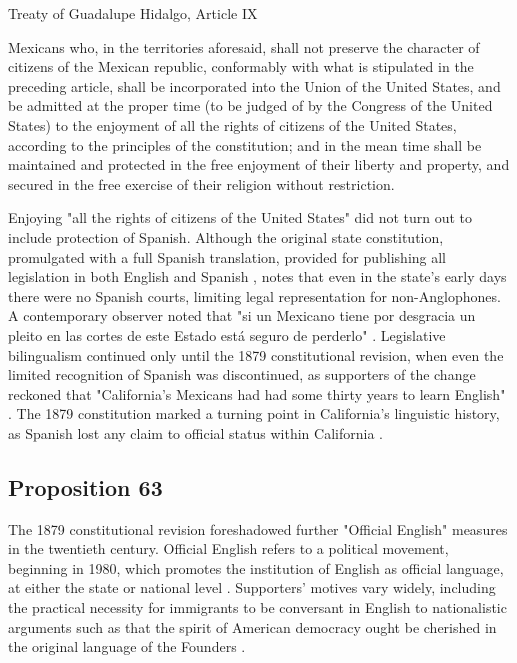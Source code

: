 \begin{aquote}{Treaty of Guadalupe Hidalgo, Article IX \parencite{guadalupe}}

	Mexicans who, in the territories aforesaid, shall not preserve the character
	of citizens of the Mexican republic, conformably with what is stipulated in
	the preceding article, shall be incorporated into the Union of the United
	States, and be admitted at the proper time (to be judged of by the Congress
	of the United States) to the enjoyment of all the rights of citizens of the
	United States, according to the principles of the constitution; and in the
	mean time shall be maintained and protected in the free enjoyment of their
	liberty and property, and secured in the free exercise of their religion
	without restriction.

\end{aquote}

Enjoying "all the rights of citizens of the United States" did not turn out to
include protection of Spanish. Although the original state constitution,
promulgated with a full Spanish translation, provided for publishing all
legislation in both English and Spanish \parencite{baron92},
\textcite{lamar-prieto14} notes that even in the state's early days there were
no Spanish courts, limiting legal representation for non-Anglophones. A
contemporary observer noted that "si un Mexicano tiene por desgracia un pleito
en las cortes de este Estado está seguro de perderlo"
\parencite[28]{lamar-prieto14}. Legislative bilingualism continued only until
the 1879 constitutional revision, when even the limited recognition of Spanish
was discontinued, as supporters of the change reckoned that "California's
Mexicans had had some thirty years to learn English" \parencite{baron92}. The
1879 constitution marked a turning point in California's linguistic history, as
Spanish lost any claim to official status within California
\parencite{baron92}.

\subsection{Proposition 63}

The 1879 constitutional revision foreshadowed further "Official English"
measures in the twentieth century. Official English refers to a political
movement, beginning in 1980, which promotes the institution of English as
official language, at either the state or national level \parencite{liu14}.
Supporters' motives vary widely, including the practical necessity for
immigrants to be conversant in English to nationalistic arguments such as that
the spirit of American democracy ought be cherished in the original language of
the Founders \parencite[7]{baron92}.

